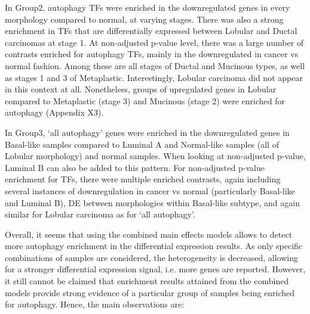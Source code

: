         In Group2, autophagy TFs were enriched in the downregulated genes in every morphology compared to normal, at varying stages. There was also a strong enrichment in TFs that are differentially expressed between Lobular and Ductal carcinomas at stage 1. At non-adjusted p-value level, there was a large number of contrasts enriched for autophagy TFs, mainly in the downregulated in cancer vs normal fashion. Among these are all stages of Ductal and Mucinous types, as well as stages 1 and 3 of Metaplastic. Interestingly, Lobular carcinoma did not appear in this context at all. Nonetheless, groups of upregulated genes in Lobular compared to Metaplastic (stage 3) and Mucinous (stage 2) were enriched for autophagy (Appendix X3). 
        
        In Group3, ‘all autophagy’ genes were enriched in the downregulated genes in Basal-like samples compared to Luminal A and Normal-like samples (all of Lobular morphology) and normal samples. When looking at non-adjusted p-value, Luminal B can also be added to this pattern. For non-adjusted p-value enrichment for TFs, there were multiple enriched contrasts, again including several instances of downregulation in cancer vs normal (particularly Basal-like and Luminal B), DE between morphologies within Basal-like subtype, and again similar for Lobular carcinoma as for ‘all autophagy’.
        
        \newpage
        Overall, it seems that using the combined main effects models allows to detect more autophagy enrichment in the differential expression results. As only specific combinations of samples are considered, the heterogeneity is decreased, allowing for a stronger differential expression signal, i.e. more genes are reported. However, it still cannot be claimed that enrichment results attained from the combined models provide strong evidence of a particular group of samples being enriched for autophagy. Hence, the main observations are:
        
